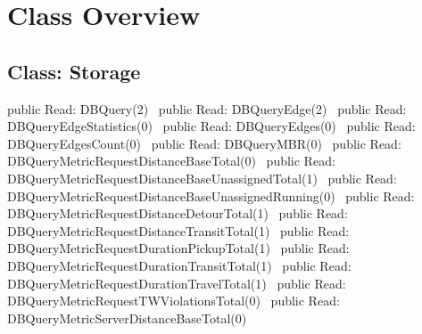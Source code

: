 \chapter*{Class Overview}
\label{overview}


\section*{Class: Storage}
\nwenddocs{}\endmoddef{}
public \LA{}Read: DBQuery(2)~{\nwtagstyle{}}\RA{}
public \LA{}Read: DBQueryEdge(2)~{\nwtagstyle{}}\RA{}
public \LA{}Read: DBQueryEdgeStatistics(0)~{\nwtagstyle{}}\RA{}
public \LA{}Read: DBQueryEdges(0)~{\nwtagstyle{}}\RA{}
public \LA{}Read: DBQueryEdgesCount(0)~{\nwtagstyle{}}\RA{}
public \LA{}Read: DBQueryMBR(0)~{\nwtagstyle{}}\RA{}
public \LA{}Read: DBQueryMetricRequestDistanceBaseTotal(0)~{\nwtagstyle{}}\RA{}
public \LA{}Read: DBQueryMetricRequestDistanceBaseUnassignedTotal(1)~{\nwtagstyle{}}\RA{}
public \LA{}Read: DBQueryMetricRequestDistanceBaseUnassignedRunning(0)~{\nwtagstyle{}}\RA{}
public \LA{}Read: DBQueryMetricRequestDistanceDetourTotal(1)~{\nwtagstyle{}}\RA{}
public \LA{}Read: DBQueryMetricRequestDistanceTransitTotal(1)~{\nwtagstyle{}}\RA{}
public \LA{}Read: DBQueryMetricRequestDurationPickupTotal(1)~{\nwtagstyle{}}\RA{}
public \LA{}Read: DBQueryMetricRequestDurationTransitTotal(1)~{\nwtagstyle{}}\RA{}
public \LA{}Read: DBQueryMetricRequestDurationTravelTotal(1)~{\nwtagstyle{}}\RA{}
public \LA{}Read: DBQueryMetricRequestTWViolationsTotal(0)~{\nwtagstyle{}}\RA{}
public \LA{}Read: DBQueryMetricServerDistanceBaseTotal(0)~{\nwtagstyle{}}\RA{}

